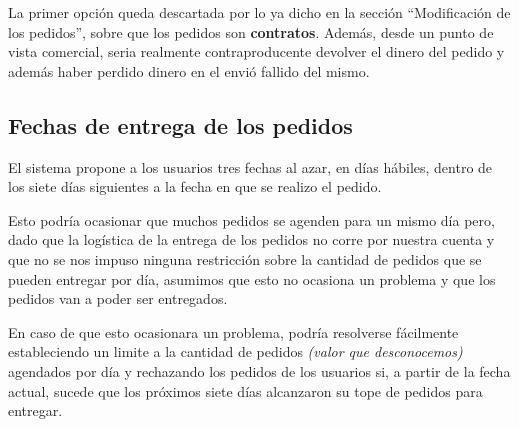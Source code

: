 La primer opción queda descartada por lo ya dicho en la sección ``Modificación de los pedidos'', sobre que los pedidos son \textbf{contratos}. Además, desde un punto de vista comercial, seria realmente contraproducente devolver el dinero del pedido y además haber perdido dinero en el envió fallido del mismo.


\subsection{Fechas de entrega de los pedidos}

El sistema propone a los usuarios tres fechas al azar, en días hábiles, dentro de los siete días siguientes a la fecha en que se realizo el pedido.

Esto podría ocasionar que muchos pedidos se agenden para un mismo día pero, dado que la logística de la entrega de los pedidos no corre por nuestra cuenta y que no se nos impuso ninguna restricción sobre la cantidad de pedidos que se pueden entregar por día, asumimos que esto no ocasiona un problema y que los pedidos van a poder ser entregados.

En caso de que esto ocasionara un problema, podría resolverse fácilmente estableciendo un limite a la cantidad de pedidos \textit{(valor que desconocemos)} agendados por día y rechazando los pedidos de los usuarios si, a partir de la fecha actual, sucede que los próximos siete días alcanzaron su tope de pedidos para entregar.
